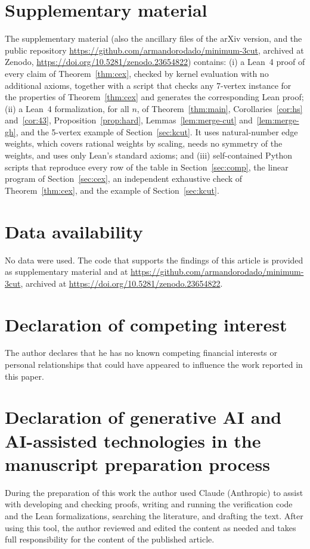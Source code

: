\documentclass[preprint,12pt]{elsarticle}
\theoremstyle{definition}
\begin{document}
\section*{Supplementary material}
The supplementary material (also the ancillary files of the arXiv version, and the public repository
\url{https://github.com/armandorodado/minimum-3cut}, archived at Zenodo,
\url{https://doi.org/10.5281/zenodo.23654822}) contains:
(i) a Lean~4 proof of every claim of Theorem~\ref{thm:cex}, checked by kernel evaluation with no
additional axioms, together with a script that checks any 7-vertex instance for the properties of
Theorem~\ref{thm:cex} and generates the corresponding Lean proof;
(ii) a Lean~4 formalization, for all $n$, of Theorem~\ref{thm:main}, Corollaries~\ref{cor:hs}
and~\ref{cor:43}, Proposition~\ref{prop:hard}, Lemmas~\ref{lem:merge-cut} and~\ref{lem:merge-gh}, and
the 5-vertex example of Section~\ref{sec:kcut}. It uses natural-number edge weights, which covers
rational weights by scaling, needs no symmetry of the weights, and uses only Lean's standard axioms;
and
(iii) self-contained Python scripts that reproduce every row of the table in Section~\ref{sec:comp},
the linear program of Section~\ref{sec:cex}, an independent exhaustive check of
Theorem~\ref{thm:cex}, and the example of Section~\ref{sec:kcut}.

\section*{Data availability}
No data were used. The code that supports the findings of this article is provided as supplementary
material and at \url{https://github.com/armandorodado/minimum-3cut}, archived at
\url{https://doi.org/10.5281/zenodo.23654822}.

\section*{Declaration of competing interest}
The author declares that he has no known competing financial interests or personal relationships
that could have appeared to influence the work reported in this paper.

\section*{Declaration of generative AI and AI-assisted technologies in the manuscript preparation process}
During the preparation of this work the author used Claude (Anthropic) to assist with developing and
checking proofs, writing and running the verification code and the Lean formalizations, searching the
literature, and drafting the text. After using this tool, the author reviewed and edited the content
as needed and takes full responsibility for the content of the published article.



\end{document}
